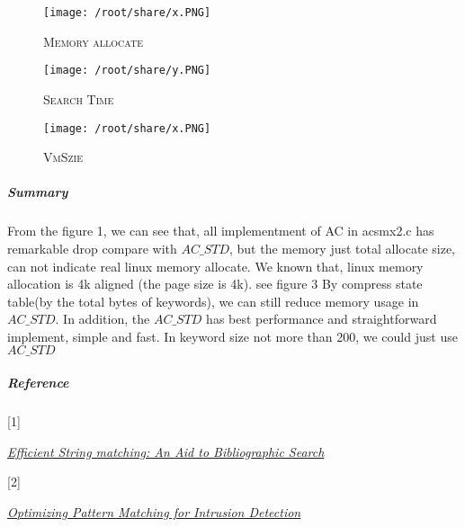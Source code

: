 \documentclass{article}
\begin{document}
\begin{figure}[h]
\caption{\textsc{Memory allocate}}
\texttt{[image: /root/share/x.PNG]}
\end{figure}

\begin{figure}[h]
\caption{\textsc{Search Time}}
\texttt{[image: /root/share/y.PNG]}
\end{figure}

\begin{figure}[h]
\caption{\textsc{VmSzie}}
\texttt{[image: /root/share/x.PNG]}
\end{figure}


\subparagraph{Summary}

From the figure 1, we can see that, all implementment of AC in acsmx2.c has remarkable drop compare with $AC\_STD$, but the memory just total allocate size, can not indicate real linux memory allocate. We known that, linux memory allocation is 4k aligned (the page size is 4k). see figure 3
By compress state table(by the total bytes of keywords), we can still reduce memory usage in $AC\_STD$. In addition, the $AC\_STD$ has best performance and straightforward implement, simple and fast. In keyword size not more than 200, we could just use $AC\_STD$


\subparagraph{Reference}
\begin{list}{}{}
  \item \hypertarget{effic}{[1]} \href{http://cr.yp.to/bib/1975/aho.pdf}{\textit{Efficient String matching: An Aid to Bibliographic Search}} \\
  \item \hypertarget{snort}{[2]} \href{http://citeseerx.ist.psu.edu/viewdoc/download?doi=10.1.1.103.4663&rep=rep1&type=pdf}{\textit{Optimizing Pattern Matching for Intrusion Detection}}
\end{list}
\end{document}
